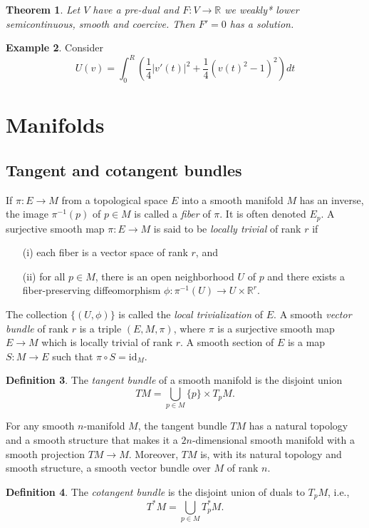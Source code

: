 \documentclass{article}
\theoremstyle{plain}
\newtheorem{teo}{Theorem}[section]
\theoremstyle{definition}
\newtheorem{defin}[teo]{Definition}
\newtheorem{exam}[teo]{Example}
\numberwithin{equation}{section}
\newcommand{\R}{\ensuremath{\mathbb{R}}}
\newcommand{\id}{\ensuremath{\mathrm{id}}}
\begin{document}
\begin{teo}
Let $V$ have a pre-dual and $F:V\to\R$ we weakly* lower semicontinuous, smooth and coercive. Then $F'=0$ has a solution.
\end{teo}

\begin{exam}
Consider
\[
U(v)=\int_0^R \left(\frac{1}{4}|v'(t)|^2+\frac{1}{4}(v(t)^2-1)^2\right)dt
\]
\end{exam}

\section{Manifolds}
\subsection{Tangent and cotangent bundles}
If $\pi:E\to M$ from a topological space $E$ into a smooth manifold $M$ has an inverse, the image $\pi^{-1}(p)$ of $p\in M$ is called a \textit{fiber} of $\pi$. It is often denoted $E_p$. A surjective smooth map $\pi: E\to M$ is said to be \textit{locally trivial} of rank $r$ if
\begin{enumerate}
	\item[(i)] each fiber is a vector space of rank $r$, and
	\item[(ii)] for all $p\in M$, there is an open neighborhood $U$ of $p$ and there exists a fiber-preserving diffeomorphism $\phi:\pi^{-1}(U)\to U\times \R^r$.
\end{enumerate}
%
The collection $\{(U,\phi)\}$ is called the \textit{local trivialization} of $E$.	A smooth \textit{vector bundle} of rank $r$ is a triple $(E,M,\pi)$, where $\pi$ is a surjective smooth map $E\to M$ which is locally trivial of rank $r$. A smooth section of $E$ is a map $S:M\to E$ such that $\pi\circ S=\id_M$. 

\begin{defin}
	The \textit{tangent bundle} of a smooth manifold is the disjoint union
	\[
	TM=\bigcup_{p\in M}\{p\}\times T_pM.
	\]
\end{defin}

For any smooth $n$-manifold $M$, the tangent bundle $TM$ has a natural topology and a smooth structure that makes it a $2n$-dimensional smooth manifold with a smooth projection $TM\to M$. Moreover, $TM$ is, with its natural topology and smooth structure, a smooth vector bundle over $M$ of rank $n$.

\begin{defin}
	The \textit{cotangent bundle} is the disjoint union of duals to $T_pM$, i.e.,
	\[
	T^*M = \bigcup_{p\in M} T_p^*M.
	\]
\end{defin}
\end{document}
